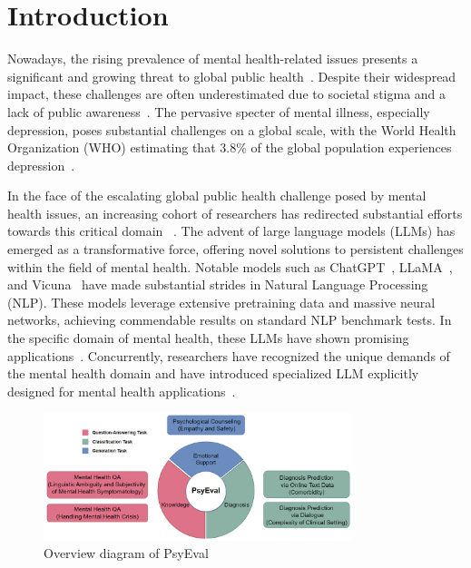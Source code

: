 \section{Introduction}
Nowadays, the rising prevalence of mental health-related issues presents a significant and growing threat to global public health~\citep{evans2018socioeconomic}. Despite their widespread impact, these challenges are often underestimated due to societal stigma and a lack of public awareness~\citep{pirina2018identifying}. The pervasive specter of mental illness, especially depression, poses substantial challenges on a global scale, with the World Health Organization (WHO) estimating that 3.8\% of the global population experiences depression~\citep{who2023depression}. 

In the face of the escalating global public health challenge posed by mental health issues, an increasing cohort of researchers has redirected substantial efforts towards this critical domain ~\citep{Lamichhane2023chatgptapp}. The advent of large language models (LLMs) has emerged as a transformative force, offering novel solutions to persistent challenges within the field of mental health. Notable models such as ChatGPT~\citep{schulman2022chatgpt}, LLaMA~\citep{touvron2023llama}, and Vicuna~\citep{chiang2023vicuna} have made substantial strides in Natural Language Processing (NLP). These models leverage extensive pretraining data and massive neural networks, achieving commendable results on standard NLP benchmark tests. In the specific domain of mental health, these LLMs have shown promising applications~\citep{xu2023leveraging, Lamichhane2023chatgptapp}. Concurrently, researchers have recognized the unique demands of the mental health domain and have introduced specialized LLM explicitly designed for mental health applications~\citep{yang2023mentallama}.

    \begin{figure}[th]
        \centering
        \includegraphics[width=0.8\textwidth]{Figure/PsyEval.png}
        \caption{Overview diagram of PsyEval}
    \end{figure}
    
